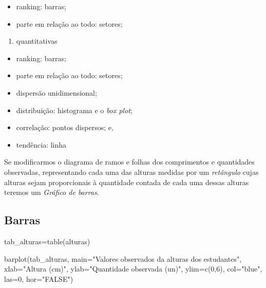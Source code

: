 \documentclass[
]{book}
\newenvironment{Shaded}{\begin{snugshade}}{\end{snugshade}}
\newcommand{\AttributeTok}[1]{\textcolor[rgb]{0.77,0.63,0.00}{#1}}
\newcommand{\DecValTok}[1]{\textcolor[rgb]{0.00,0.00,0.81}{#1}}
\newcommand{\FunctionTok}[1]{\textcolor[rgb]{0.00,0.00,0.00}{#1}}
\newcommand{\NormalTok}[1]{#1}
\newcommand{\OtherTok}[1]{\textcolor[rgb]{0.56,0.35,0.01}{#1}}
\newcommand{\StringTok}[1]{\textcolor[rgb]{0.31,0.60,0.02}{#1}}
\providecommand{\tightlist}{%
  \setlength{\itemsep}{0pt}\setlength{\parskip}{0pt}}
\begin{document}
\begin{itemize}
\tightlist
\item
  ranking: barras;
\item
  parte em relação ao todo: setores;
\end{itemize}

\begin{enumerate}
\def\labelenumi{\arabic{enumi}.}
\setcounter{enumi}{1}
\tightlist
\item
  quantitativas
\end{enumerate}

\begin{itemize}
\tightlist
\item
  ranking: barras;
\item
  parte em relação ao todo: setores;
\item
  dispersão unidimensional;
\item
  distribuição: histograma e o \emph{box plot};
\item
  correlação: pontos dispersos; e,
\item
  tendência: linha
\end{itemize}

Se modificarmos o diagrama de ramos e folhas dos comprimentos e quantidades observadas, representando cada uma das alturas medidas por um \emph{retângulo} cujas alturas sejam proporcionais à quantidade contada de cada uma dessas alturas teremos um \emph{Gráfico de barras}.

\hypertarget{barras}{%
\subsection{Barras}\label{barras}}

\begin{Shaded}
\begin{Highlighting}[]
\NormalTok{tab\_alturas}\OtherTok{=}\FunctionTok{table}\NormalTok{(alturas)}

\FunctionTok{barplot}\NormalTok{(tab\_alturas,}
        \AttributeTok{main=}\StringTok{"Valores observados da alturas dos estudantes"}\NormalTok{,}
        \AttributeTok{xlab=}\StringTok{"Altura (cm)"}\NormalTok{,}
        \AttributeTok{ylab=}\StringTok{"Quantidade observada (un)"}\NormalTok{,}
        \AttributeTok{ylim=}\FunctionTok{c}\NormalTok{(}\DecValTok{0}\NormalTok{,}\DecValTok{6}\NormalTok{),}
        \AttributeTok{col=}\StringTok{"blue"}\NormalTok{,}
        \AttributeTok{las=}\DecValTok{0}\NormalTok{, }
        \AttributeTok{hor=}\StringTok{"FALSE"}\NormalTok{)}
\end{Highlighting}
\end{Shaded}
\end{document}
